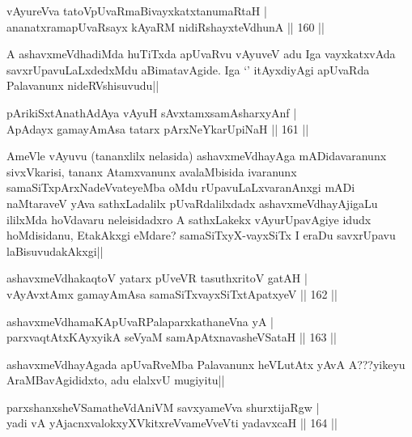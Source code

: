 \begin{shl}
vAyureVva tatoV\s pUvaRmaBivayxkatxtanumaRtaH |\\
ananatxramapUvaRsayx kAyaRM nidiRshayxteV\s dhunA \hfill || 160 ||
\end{shl}

\begin{artha}
A ashavxmeVdhadiMda huTiTxda apUvaRvu vAyuveV adu Iga vayxkatxvAda savxrUpavuLaLxdedxMdu aBimatavAgide. Iga `\stext' itAyxdiyAgi apUvaRda Palavanunx nideRVshisuvudu||
\end{artha}

\begin{shl}
pArikiSxtAnathA\s \s dAya vAyuH sAvxtamxsamAsharxyAnf |\\
ApAdayx gamayAmAsa tatarx pArxNeYkarUpiNaH \hfill || 161 ||
\end{shl}

\begin{artha}
AmeVle vAyuvu (tananxlilx nelasida) ashavxmeVdhayAga mADidavaranunx sivxVkarisi, tananx Atamxvanunx avalaMbisida ivaranunx samaSiTxpArxNadeVvateyeMba oMdu rUpavuLaLxvaranAnxgi mADi naMtaraveV yAva sathxLadalilx pUvaRdalilxdadx ashavxmeVdhayAjigaLu ililxMda hoVdavaru neleisidadxro A sathxLakekx vAyurUpavAgiye idudx hoMdisidanu, EtakAkxgi eMdare? samaSiTxyX-vayxSiTx I eraDu savxrUpavu laBisuvudakAkxgi||
\end{artha}

\begin{shl}
ashavxmeVdhakaqtoV yatarx pUveVR tasuthxritoV gatAH |\\
vAyAvxtAmx gamayAmAsa samaSiTxvayxSiTxtApatxyeV \hfill || 162 ||
\end{shl}

\begin{shl}
ashavxmeVdhamaKApUvaRPalaparxkathaneVna yA |\\
parxvaqtAtx\s \s KAyxyikA seVyaM samApAtx\s navasheVSataH \hfill || 163 ||
\end{shl}

\begin{artha}
ashavxmeVdhayAgada apUvaRveMba Palavanunx heVLutAtx yAvA A???yikeyu AraMBavAgididxto, adu elalxvU mugiyitu||
\end{artha}

\begin{shl}
parxshanxsheVSamatheVdAniVM savxyameVva shurxtijaRgw |\\
yadi vA yAjacnxvalokxyXVkitxreVvameVveVti yadavxcaH \hfill || 164 ||
\end{shl}

